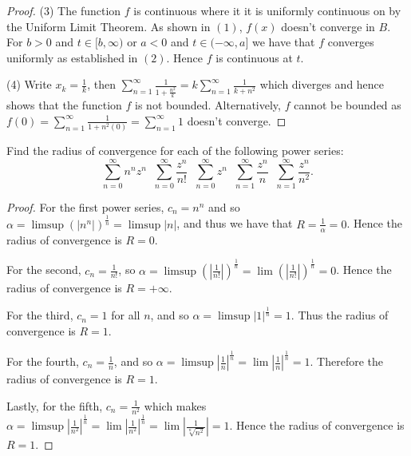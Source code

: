 \documentclass[oneside]{amsart}
\theoremstyle{definition}
\begin{document}
\begin{tcolorbox}[colback=black!5!white,colframe=black!75!black,title= Exercise $4.1.$]
\begin{proof}
 (3) The function $f$ is continuous where it it is uniformly continuous on by the Uniform Limit Theorem. As shown in $(1)$, $f(x)$ doesn't converge in $B$. For $b>0$ and $t \in [b, \infty)$ or $a < 0$ and $t \in (-\infty, a]$ we have that $f$ converges uniformly as established in $(2)$. Hence $f$ is continuous at $t$. 
 
 (4) Write $x_k = \frac{1}{k}$, then $\sum_{n=1}^\infty \frac{1}{1+\frac{n^2}{k}} = k \sum_{n=1}^\infty \frac{1}{k+n^2}$ which diverges and hence shows that the function $f$ is not bounded. Alternatively, $f$ cannot be bounded as $f(0) = \sum_{n=1}^\infty \frac{1}{1+n^2(0)} = \sum_{n=1}^\infty 1$ doesn't converge. 
\end{proof}

\end{tcolorbox}


\begin{tcolorbox}[colback=black!5!white,colframe=black!75!black,title= Exercise $4.2.$] Find the radius of convergence for each of the following power series:
\[
\sum_{n=0}^\infty n^n z^n\; \;  \sum _{n=0}^\infty \frac{z^n}{n!}\; \;  \sum_{n=0}^\infty z^n\; \; \sum_{n=1}^\infty \frac{z^n}{n}\; \;  \sum _{n=1}^\infty \frac{z^n}{n^2}.
\] 
\tcblower 
\begin{proof} 


For the first power series, $c_n = n^n$ and so $\alpha = \limsup (|n^n|)^\frac{1}{n} = \limsup |n|$, and thus we have that $R = \frac{1}{\alpha} = 0$. Hence the radius of convergence is $R = 0$.

For the second, $c_n = \frac{1}{n!}$, so $\alpha = \limsup \left ( \left |\frac{1}{n!} \right |\right )^\frac{1}{n} = \lim \left ( \left |\frac{1}{n!} \right |\right )^\frac{1}{n} = 0$. Hence the radius of convergence is $R = +\infty$.

For the third, $c_n =1$ for all $n$, and so $ \alpha = \limsup |1|^\frac{1}{n} =1$. Thus the radius of convergence is $R = 1$.

For the fourth, $c_n = \frac{1}{n}$, and so $\alpha = \limsup |\frac{1}{n}|^\frac{1}{n} = \lim |\frac{1}{n}|^\frac{1}{n} = 1$. Therefore the radius of convergence is $R = 1$.

Lastly, for the fifth, $ c_n = \frac{1}{n^2}$ which makes $ \alpha = \limsup | \frac{1}{n^2}|^\frac{1}{n}=\lim |\frac{1}{n^2}|^\frac{1}{n} = \lim \left |\frac{1}{\sqrt[n]{n^2}} \right | = 1$. Hence the radius of convergence is $R = 1$.
\end{proof}
\end{tcolorbox}
\end{document}
